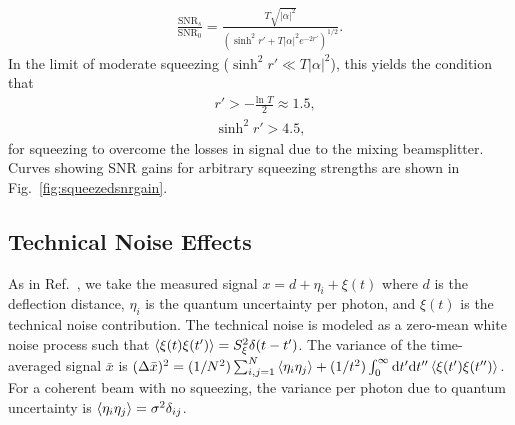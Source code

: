 \begin{align}
\frac{\text{SNR}_s}{\text{SNR}_0} = \frac{T\sqrt{|\alpha |^2} }{(\sinh^2 r' + T|\alpha |^2 e^{-2r'})^{1/2}}.
\end{align}
In the limit of moderate squeezing ($\sinh^2 r' \ll T|\alpha |^2$), this yields the condition that 
\begin{align}
&r' > -\frac{\text{ln }T}{2} \approx 1.5, \\
&\sinh^2 r' > 4.5,
\end{align}
for squeezing to overcome the losses in signal due to the mixing beamsplitter.  Curves showing SNR gains for arbitrary squeezing strengths are shown in Fig.~\ref{fig:squeezedsnrgain}.
\subsection{Technical Noise Effects}
As in Ref.~\cite{Starling2009}, we take the measured signal $x = d + \eta_i + \xi(t)$ where $d$ is the deflection distance, $\eta_i$ is the quantum uncertainty per photon, and $\xi(t)$ is the technical noise contribution.  The technical noise is modeled as a zero-mean white noise process such that $\left\langle \xi(t)\xi(t') \right\rangle = S_\xi^2\delta(t-t')$.  The variance of the time-averaged signal $\bar{x}$ is $(\Delta \bar{x})^2 = (1/N^2)\sum^N_{i,j=1}\left\langle \eta_i\eta_j \right\rangle + (1/t^2)\int^\infty_0\text{d}t'\text{d}t''\left\langle \xi(t')\xi(t'') \right\rangle$.  For a coherent beam with no squeezing, the variance per photon due to quantum uncertainty is $\left\langle \eta_i\eta_j \right\rangle = \sigma^2\delta_{ij}$.


